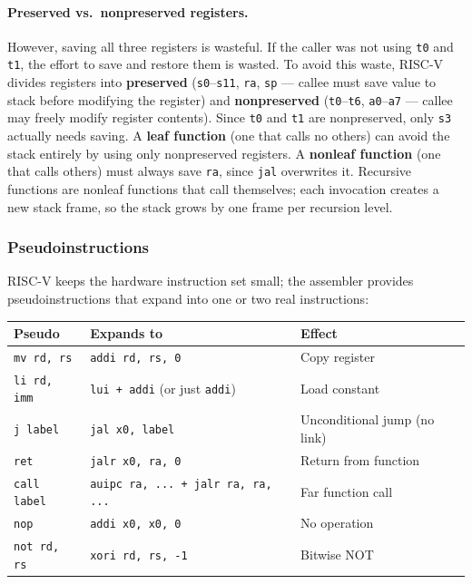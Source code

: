 \documentclass[9pt, a4paper]{extarticle}
\begin{document}
\paragraph{Preserved vs.\ nonpreserved registers.} However, saving all three registers is wasteful. If the caller was not using \texttt{t0} and \texttt{t1}, the effort to save and restore them is wasted. To avoid this waste, RISC-V divides registers into \textbf{preserved} (\texttt{s0}--\texttt{s11}, \texttt{ra}, \texttt{sp} --- callee must save value to stack before modifying the register) and \textbf{nonpreserved} (\texttt{t0}--\texttt{t6}, \texttt{a0}--\texttt{a7} --- callee may freely modify register contents). Since \texttt{t0} and \texttt{t1} are nonpreserved, only \texttt{s3} actually needs saving. A \textbf{leaf function} (one that calls no others) can avoid the stack entirely by using only nonpreserved registers. A \textbf{nonleaf function} (one that calls others) must always save \texttt{ra}, since \texttt{jal} overwrites it. Recursive functions are nonleaf functions that call themselves; each invocation creates a new stack frame, so the stack grows by one frame per recursion level.

\subsubsection{Pseudoinstructions}

RISC-V keeps the hardware instruction set small; the assembler provides pseudoinstructions that expand into one or two real instructions:

\begin{center}\small
\begin{tabular}{@{}l l l@{}}
    \toprule
    Pseudo & Expands to & Effect \\
    \midrule
    \texttt{mv rd, rs} & \texttt{addi rd, rs, 0} & Copy register \\
    \texttt{li rd, imm} & \texttt{lui + addi} (or just \texttt{addi}) & Load constant \\
    \texttt{j label} & \texttt{jal x0, label} & Unconditional jump (no link) \\
    \texttt{ret} & \texttt{jalr x0, ra, 0} & Return from function \\
    \texttt{call label} & \texttt{auipc ra, ... + jalr ra, ra, ...} & Far function call \\
    \texttt{nop} & \texttt{addi x0, x0, 0} & No operation \\
    \texttt{not rd, rs} & \texttt{xori rd, rs, -1} & Bitwise NOT \\
    \bottomrule
\end{tabular}
\end{center}
\end{document}
